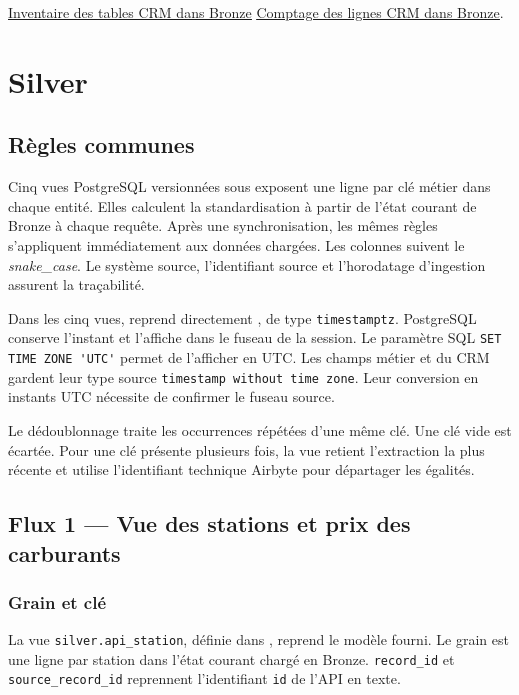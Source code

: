\documentclass[11pt,a4paper]{article}
\newcommand{\code}[1]{\texttt{#1}}
\newcommand{\preuve}[2]{%
  \href{https://github.com/MAHDIghr/projet_big_data_starter/blob/27cc8348f6737a75bb24a40d6d8cda3ae54996b3/preuves/#1}{\textcolor{encre}{\underline{#2}}}}
\begin{document}
\preuve{crm/crm_01_tables_bronze.png}{Inventaire des tables CRM dans Bronze}
\quad
\preuve{crm/crm_02_volumes_bronze.png}{Comptage des lignes CRM dans Bronze}.

\section{Silver}

\subsection{Règles communes}

Cinq vues PostgreSQL versionnées sous  exposent
une ligne par clé métier dans chaque entité. Elles calculent la
standardisation à partir de l'état courant de Bronze à chaque requête.
Après une synchronisation, les mêmes règles s'appliquent immédiatement
aux données chargées. Les colonnes suivent le \emph{snake\_case}.
Le système source, l'identifiant source et l'horodatage d'ingestion
assurent la traçabilité.

Dans les cinq vues,  reprend directement
, de type \code{timestamptz}. PostgreSQL
conserve l'instant et l'affiche dans le fuseau de la session. Le
paramètre SQL \verb|SET TIME ZONE 'UTC'| permet de l'afficher en UTC.
Les champs métier  et  du CRM
gardent leur type source \code{timestamp without time zone}. Leur
conversion en instants UTC nécessite de confirmer le fuseau source.

Le dédoublonnage traite les occurrences répétées d'une même clé.
Une clé vide est écartée. Pour une clé présente plusieurs fois,
la vue retient l'extraction la plus récente et utilise l'identifiant
technique Airbyte pour départager les égalités.

\subsection{Flux 1 --- Vue des stations et prix des carburants}

\subsubsection{Grain et clé}

La vue \code{silver.api\_station}, définie dans
, reprend le modèle fourni.
Le grain est une ligne par station dans l'état courant chargé
en Bronze. \code{record\_id} et \code{source\_record\_id} reprennent
l'identifiant \code{id} de l'API en texte.
\end{document}
